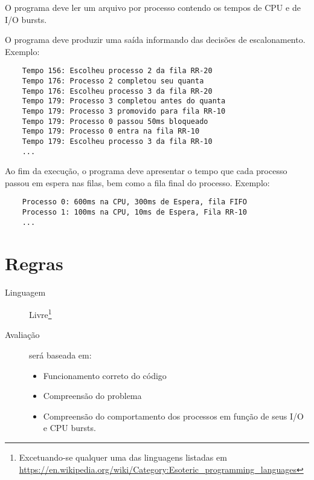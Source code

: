 \documentclass[a4paper, oneside,12pt]{article}
\begin{document}
O programa deve ler um arquivo por processo contendo os tempos de CPU e de I/O bursts.

O programa deve produzir uma saída informando das decisões de escalonamento. Exemplo:
\begin{verbatim}
    Tempo 156: Escolheu processo 2 da fila RR-20
    Tempo 176: Processo 2 completou seu quanta
    Tempo 176: Escolheu processo 3 da fila RR-20
    Tempo 179: Processo 3 completou antes do quanta
    Tempo 179: Processo 3 promovido para fila RR-10
    Tempo 179: Processo 0 passou 50ms bloqueado
    Tempo 179: Processo 0 entra na fila RR-10
    Tempo 179: Escolheu processo 3 da fila RR-10
    ...
\end{verbatim}


Ao fim da execução, o programa deve apresentar o tempo que cada processo passou em espera nas filas, bem como a fila final do processo. Exemplo:
\begin{verbatim}
    Processo 0: 600ms na CPU, 300ms de Espera, fila FIFO
    Processo 1: 100ms na CPU, 10ms de Espera, Fila RR-10
    ...
\end{verbatim}

\section{Regras}

\begin{description}
    \item[Linguagem] Livre\footnote{Excetuando-se qualquer uma das linguagens listadas em \url{https://en.wikipedia.org/wiki/Category:Esoteric_programming_languages}}
    \item[Avaliação] será baseada em:
        \begin{itemize}
            \item Funcionamento correto do código
            \item Compreensão do problema
            \item Compreensão do comportamento dos processos em função de seus I/O e CPU bursts.
        \end{itemize}

\end{description}
\label{sec:prazos}
\end{document}
